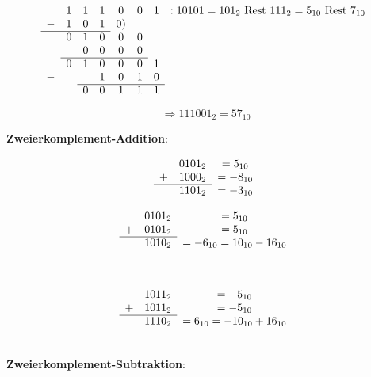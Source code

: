 \documentclass{article}
\begin{document}
\[
  \begin{array}{ cccc cccc }
     &1&1&1&0&0&1 &: 10101 = 101_2 \text{ Rest } 111_2 = 5_{10} \text{ Rest } 7_{10} \\
    -&1&0&1&0) \\
    \cline{1-4}
     &0&1&0&0&0 \\
    -& &0&0&0&0 \\
    \cline{2-6}
     &0&1&0&0&0&1 \\    
    -& & &1&0&1&0 \\
    \cline{3-7}
     & &0&0&1&1&1 \\    
  \end{array}
\]

\[
  \Rightarrow 111001_2 = 57_{10}
\]

\textbf{Zweierkomplement-Addition}:

\begin{minipage}[t]{.4\textwidth}
  \[
    \begin{array}{ccc}
       & 0101_2 &= 5_{10} \\
      +& 1000_2 &= -8_{10} \\
      \cline{1-2}
       & 1101_2 &= -3_{10} \\
    \end{array}
  \]
\end{minipage}
\hfill
\vrule
\hfill
\begin{minipage}[t]{.4\textwidth}
  \[
    \begin{array}{ccc}
       & 0101_2 &= 5_{10} \\
      +& 0101_2 &= 5_{10} \\
      \cline{1-2}
       & 1010_2 &= -6_{10} = 10_{10} - 16_{10}\\
    \end{array}
  \]
\end{minipage}  \\

\begin{minipage}[t]{.4\textwidth}
  \[
    \begin{array}{ccc}
       & 1011_2 &= -5_{10} \\
      +& 1011_2 &= -5_{10} \\
      \cline{1-2}
       & 1110_2 &= 6_{10} = -10_{10} + 16_{10} \\
    \end{array}
  \]
\end{minipage}  \\

\textbf{Zweierkomplement-Subtraktion}:
\end{document}
